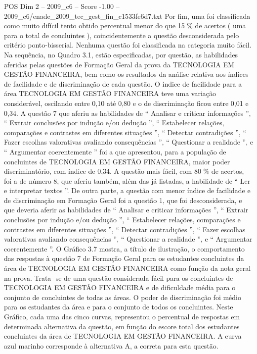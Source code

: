 \begin{textsample}{POS Dim 2 – 2009\_c6 – Score -1.00 – 2009\_c6/enade\_2009\_tec\_gest\_fin\_c1533fe6d7.txt}
Por fim, uma foi classificada como muito difícil tento obtido percentual menor do que 15 \% de acertos ( uma para o total de concluintes ), coincidentemente a questão desconsiderada pelo critério ponto-bisserial.
Nenhuma questão foi classificada na categoria muito fácil.
Na sequência, no Quadro 3.1, estão especificadas, por questão, as habilidades aferidas pelas questões de Formação Geral da prova da TECNOLOGIA EM GESTÃO FINANCEIRA, bem como os resultados da análise relativa aos índices de facilidade e de discriminação de cada questão.
O índice de facilidade para a área TECNOLOGIA EM GESTÃO FINANCEIRA teve uma variação considerável, oscilando entre 0,10 até 0,80 e o de discriminação ficou entre 0,01 e 0,34.
A questão 7 que aferiu as habilidades de “ Analisar e criticar informações ”, “ Extrair conclusões por indução e/ou dedução ”, “ Estabelecer relações, comparações e contrastes em diferentes situações ”, “ Detectar contradições ”, “ Fazer escolhas valorativas avaliando consequências ”, “ Questionar a realidade ”, e “ Argumentar coerentemente ” foi a que apresentou, para a população de concluintes de TECNOLOGIA EM GESTÃO FINANCEIRA, maior poder discriminatório, com índice de 0,34.
A questão mais fácil, com 80 \% de acertos, foi a de número 8, que aferiu também, além das já listadas, a habilidade de “ Ler e interpretar textos ”.
De outra parte, a questão com menor índice de facilidade e de discriminação em Formação Geral foi a questão 1, que foi desconsiderada, e que deveria aferir as habilidades de “ Analisar e criticar informações ”, “ Extrair conclusões por indução e/ou dedução ”, “ Estabelecer relações, comparações e contrastes em diferentes situações ”, “ Detectar contradições ”, “ Fazer escolhas valorativas avaliando consequências ”, “ Questionar a realidade ”, e “ Argumentar coerentemente ”.
O Gráfico 3.7 mostra, a título de ilustração, o comportamento das respostas à questão 7 de Formação Geral para os estudantes concluintes da área de TECNOLOGIA EM GESTÃO FINANCEIRA como função da nota geral na prova.
Trata -se de uma questão considerada fácil para os concluintes de TECNOLOGIA EM GESTÃO FINANCEIRA e de dificuldade média para o conjunto de concluintes de todas as áreas.
O poder de discriminação foi médio para os estudantes da área e para o conjunto de todos os concluintes.
Neste Gráfico, cada uma das cinco curvas, representou o percentual de respostas em determinada alternativa da questão, em função do escore total dos estudantes concluintes da área de TECNOLOGIA EM GESTÃO FINANCEIRA.
A curva azul marinho corresponde à alternativa A, a correta para esta questão.

\end{textsample}
